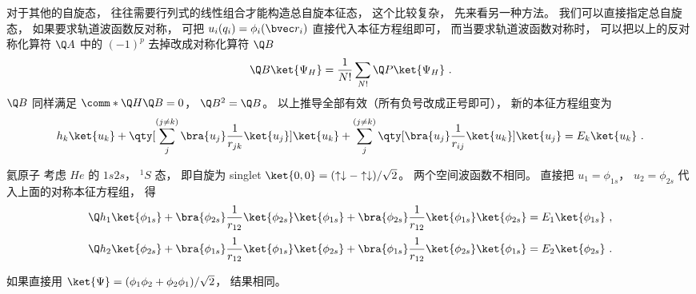 对于其他的自旋态， 往往需要行列式的线性组合才能构造总自旋本征态， 这个比较复杂， 先来看另一种方法。 我们可以直接指定总自旋态， 如果要求轨道波函数反对称， 可把 $u_i(q_i) = \phi_i(\bvec r_i)$ 直接代入本征方程组即可， 而当要求轨道波函数对称时， 可以把以上的反对称化算符 $\Q A$ 中的 $(-1)^p$ 去掉改成对称化算符 $\Q B$ 
\begin{equation}
\Q B \ket{\Psi_H}  = \frac{1}{N!} \sum_{N!} \Q P\ket{\Psi_H}~.
\end{equation}
$\Q B$ 同样满足 $\comm*{\Q H}{\Q B} = 0$，  $\Q B^2 = \Q B$。  以上推导全部有效（所有负号改成正号即可）， 新的本征方程组变为
\begin{equation}
h_k \ket{u_k} + \qty[\sum_j^{(j \ne k)} \bra{u_j} \frac{1}{r_{jk}} \ket{u_j}] \ket{u_k} + \sum_j^{(j \ne k)} \qty[\bra{u_j} \frac{1}{r_{ij}} \ket{u_k}] \ket{u_j} = E_k \ket{u_k}~.
\end{equation}

\begin{example}{氦原子}
考虑 $He$ 的 $1s2s$，  $^1S$ 态， 即自旋为 singlet $\ket{0,0}  = (\uparrow\downarrow  -  \uparrow\downarrow)/\sqrt 2 $。  两个空间波函数不相同。 直接把 $u_1 = \phi_{1s}$， $u_2 = \phi_{2s}$ 代入上面的对称本征方程组， 得
\begin{equation}
\Q h_1 \ket{\phi_{1s}} + \bra{\phi_{2s}} \frac{1}{r_{12}} \ket{\phi_{2s}} \ket{\phi_{1s}} + \bra{\phi_{2s}} \frac{1}{r_{12}} \ket{\phi_{1s}} \ket{\phi_{2s}} = E_1\ket{\phi_{1s}}~,
\end{equation}
\begin{equation}
\Q h_2 \ket{\phi_{2s}} + \bra{\phi_{1s}} \frac{1}{r_{12}} \ket{\phi_{1s}} \ket{\phi_{2s}} + \bra{\phi_{1s}} \frac{1}{r_{12}} \ket{\phi_{2s}} \ket{\phi_{1s}} = E_2 \ket{\phi_{2s}} ~.
\end{equation}

如果直接用 $\ket{\Psi} = (\phi_1 \phi_2 + \phi_2\phi_1)/\sqrt 2$，  结果相同。
\end{example}
 
